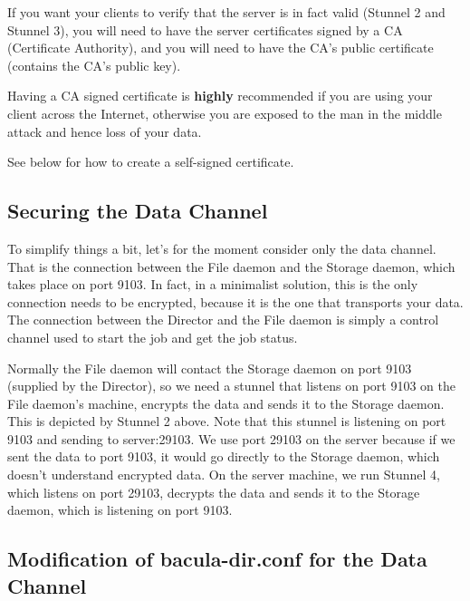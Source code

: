 If you want your clients to verify that the server is in fact valid (Stunnel 2
and Stunnel 3), you will need to have the server certificates signed by a CA
(Certificate Authority), and you will need to have the CA's public certificate
(contains the CA's public key). 

Having a CA signed certificate is {\bf highly} recommended if you are using
your client across the Internet, otherwise you are exposed to the man in the
middle attack and hence loss of your data. 

See below for how to create a self-signed certificate. 

\subsection*{Securing the Data Channel}

To simplify things a bit, let's for the moment consider only the data channel.
That is the connection between the File daemon and the Storage daemon, which
takes place on port 9103. In fact, in a minimalist solution, this is the only
connection needs to be encrypted, because it is the one that transports your
data. The connection between the Director and the File daemon is simply a
control channel used to start the job and get the job status. 

Normally the File daemon will contact the Storage daemon on port 9103
(supplied by the Director), so we need a stunnel that listens on port 9103 on
the File daemon's machine, encrypts the data and sends it to the Storage
daemon. This is depicted by Stunnel 2 above. Note that this stunnel is
listening on port 9103 and sending to server:29103. We use port 29103 on the
server because if we sent the data to port 9103, it would go directly to the
Storage daemon, which doesn't understand encrypted data. On the server
machine, we run Stunnel 4, which listens on port 29103, decrypts the data and
sends it to the Storage daemon, which is listening on port 9103. 

\subsection*{Modification of bacula-dir.conf for the Data Channel}

